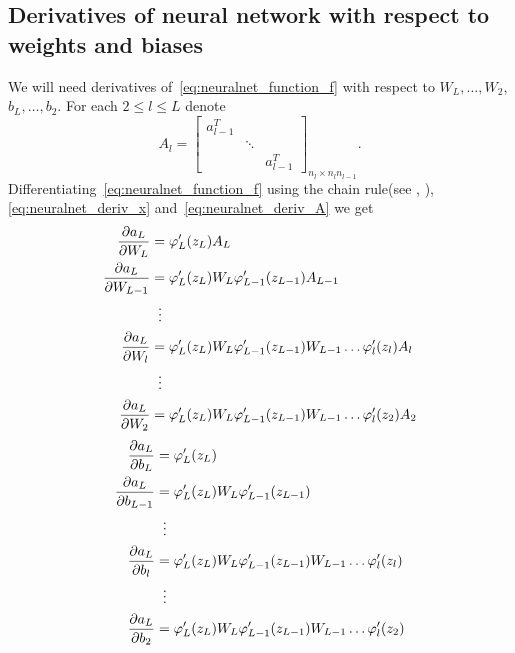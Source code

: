 \subsection{Derivatives of neural network with respect to weights and
  biases}

We will need derivatives of~\eqref{eq:neuralnet_function_f} with
respect to $W_L, \ldots, W_2$, $b_L, \ldots, b_2$. For each $2 \leq l
\leq L$ denote
\begin{equation*}
  A_l =
  \begin{bmatrix}
    a_{l - 1}^T &        &             \\
                & \ddots &             \\
                &        & a_{l - 1}^T
  \end{bmatrix}_{n_l \times n_ln_{l - 1}}.
\end{equation*}
Differentiating~\eqref{eq:neuralnet_function_f} using the chain
rule(see \cite [section 4.3.6] {rudnicki-2012}, \cite [theorem 2.2]
{spivak-2005}), \eqref{eq:neuralnet_deriv_x}
and~\eqref{eq:neuralnet_deriv_A} we get
\begin{align} \label{eq:neuralnet_daldwl}
  \frac{\partial a_L}{\partial W_{L}} &=
  \varphi_{L}'(z_{L})A_{L} \notag \\
  \frac{\partial a_L}{\partial W_{L - 1}} &=
  \varphi_{L}'(z_{L})W_{L}\varphi_{L - 1}'(z_{L - 1})A_{L - 1} \notag
  \\
  &\;\;\vdots \notag \\
  \frac{\partial a_L}{\partial W_{l}} &=
  \varphi_{L}'(z_{L})W_{L}\varphi_{L - 1}'(z_{L - 1})W_{L - 1} \ldots
  \varphi_{l}'(z_{l})A_{l} \\
  &\;\;\vdots \notag \\
  \frac{\partial a_L}{\partial W_{2}} &=
  \varphi_{L}'(z_{L})W_{L}\varphi_{L - 1}'(z_{L - 1})W_{L - 1} \ldots
  \varphi_{l}'(z_{2})A_{2}\notag
\end{align}
\begin{align} \label{eq:neuralnet_daldbl}
  \frac{\partial a_L}{\partial b_{L}} &=
  \varphi_{L}'(z_{L}) \notag \\
  \frac{\partial a_L}{\partial b_{L - 1}} &=
  \varphi_{L}'(z_{L})W_{L}\varphi_{L - 1}'(z_{L - 1}) \notag \\
  &\;\;\vdots \notag \\
  \frac{\partial a_L}{\partial b_{l}} &=
  \varphi_{L}'(z_{L})W_{L}\varphi_{L - 1}'(z_{L - 1})W_{L - 1} \ldots
  \varphi_{l}'(z_{l}) \\
  &\;\;\vdots \notag \\
  \frac{\partial a_L}{\partial b_{2}} &=
  \varphi_{L}'(z_{L})W_{L}\varphi_{L - 1}'(z_{L - 1})W_{L - 1} \ldots
  \varphi_{l}'(z_{2})\notag
\end{align}


